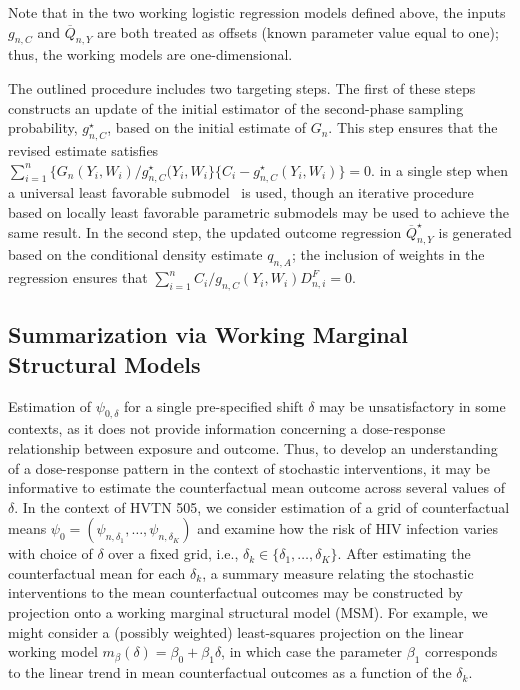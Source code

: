 Note that in the two working logistic regression models defined above, the
inputs $g_{n,C}$ and $\overline{Q}_{n,Y}$ are both treated as offsets (known
parameter value equal to one); thus, the working models are one-dimensional.

The outlined procedure includes two targeting steps. The first of these steps
constructs an update of the initial estimator of the second-phase sampling
probability, $g_{n,C}^{\star}$, based on the initial estimate of $G_n$. This
step ensures that the revised estimate satisfies $\sum_{i=1}^n \{G_n(Y_i, W_i)
/ g_{n,C}^{\star}(Y_i,W_i\} \{C_i - g_{n,C}^{\star}(Y_i, W_i)\} = 0$. in
a single step when a universal least favorable submodel~\citep{vdl2016one} is
used, though an iterative procedure based on locally least favorable parametric
submodels may be used to achieve the same result. In the second step, the
updated outcome regression $\overline{Q}_{n,Y}^{\star}$ is generated based on
the conditional density estimate $q_{n,A}$; the inclusion of weights in the
regression ensures that $\sum_{i=1}^n C_i/g_{n,C}(Y_i, W_i) D_{n,i}^F = 0$.

\subsection{Summarization via Working Marginal Structural
Models}\label{msm_summary}

Estimation of $\psi_{0,\delta}$ for a single pre-specified shift $\delta$ may be
unsatisfactory in some contexts, as it does not provide information concerning
a dose-response relationship between exposure and outcome. Thus, to develop an
understanding of a dose-response pattern in the context of stochastic
interventions, it may be informative to estimate the counterfactual mean outcome
across several values of $\delta$. In the context of HVTN 505, we consider
estimation of a grid of counterfactual means $\psi_0 = (\psi_{n,\delta_1},
\ldots, \psi_{n,\delta_K})$ and examine how the risk of HIV infection varies
with choice of $\delta$ over a fixed grid, i.e., $\delta_k \in \{\delta_1,
\ldots, \delta_K\}$. After estimating the counterfactual mean for each
$\delta_k$, a summary measure relating the stochastic
interventions to the mean counterfactual outcomes may be constructed by
projection onto a working marginal structural model (MSM). For example, we might
consider a (possibly weighted) least-squares projection on the linear working
model $m_{\beta}(\delta) = \beta_0 + \beta_1 \delta$, in which case the
parameter $\beta_1$ corresponds to the linear trend in mean counterfactual
outcomes as a function of the $\delta_k$.

